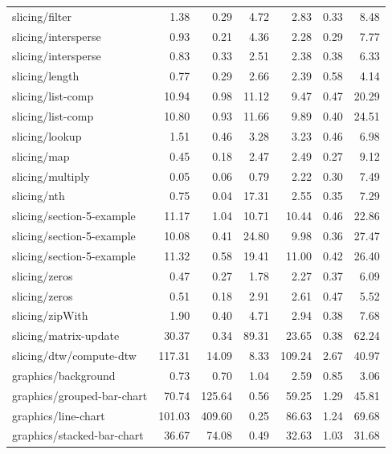 \begin{longtable}{lrrrrrr}
slicing/filter & 1.38 & 0.29 & 4.72 & 2.83 & 0.33 & 8.48 \\
slicing/intersperse & 0.93 & 0.21 & 4.36 & 2.28 & 0.29 & 7.77 \\
slicing/intersperse & 0.83 & 0.33 & 2.51 & 2.38 & 0.38 & 6.33 \\
slicing/length & 0.77 & 0.29 & 2.66 & 2.39 & 0.58 & 4.14 \\
slicing/list-comp & 10.94 & 0.98 & 11.12 & 9.47 & 0.47 & 20.29 \\
slicing/list-comp & 10.80 & 0.93 & 11.66 & 9.89 & 0.40 & 24.51 \\
slicing/lookup & 1.51 & 0.46 & 3.28 & 3.23 & 0.46 & 6.98 \\
slicing/map & 0.45 & 0.18 & 2.47 & 2.49 & 0.27 & 9.12 \\
slicing/multiply & 0.05 & 0.06 & 0.79 & 2.22 & 0.30 & 7.49 \\
slicing/nth & 0.75 & 0.04 & 17.31 & 2.55 & 0.35 & 7.29 \\
slicing/section-5-example & 11.17 & 1.04 & 10.71 & 10.44 & 0.46 & 22.86 \\
slicing/section-5-example & 10.08 & 0.41 & 24.80 & 9.98 & 0.36 & 27.47 \\
slicing/section-5-example & 11.32 & 0.58 & 19.41 & 11.00 & 0.42 & 26.40 \\
slicing/zeros & 0.47 & 0.27 & 1.78 & 2.27 & 0.37 & 6.09 \\
slicing/zeros & 0.51 & 0.18 & 2.91 & 2.61 & 0.47 & 5.52 \\
slicing/zipWith & 1.90 & 0.40 & 4.71 & 2.94 & 0.38 & 7.68 \\
slicing/matrix-update & 30.37 & 0.34 & 89.31 & 23.65 & 0.38 & 62.24 \\
slicing/dtw/compute-dtw & 117.31 & 14.09 & 8.33 & 109.24 & 2.67 & 40.97 \\
graphics/background & 0.73 & 0.70 & 1.04 & 2.59 & 0.85 & 3.06 \\
graphics/grouped-bar-chart & 70.74 & 125.64 & 0.56 & 59.25 & 1.29 & 45.81 \\
graphics/line-chart & 101.03 & 409.60 & 0.25 & 86.63 & 1.24 & 69.68 \\
graphics/stacked-bar-chart & 36.67 & 74.08 & 0.49 & 32.63 & 1.03 & 31.68 \\
\end{longtable}
